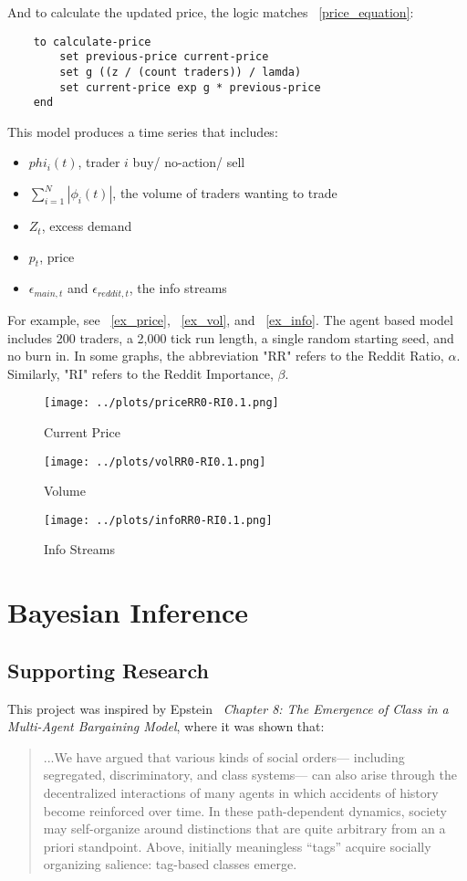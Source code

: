 \documentclass[a4paper, 11pt]{report}
\let\Oldsection\section
\renewcommand{\section}{\FloatBarrier\Oldsection}
\begin{document}
	\noindent And to calculate the updated price, the logic matches ~\autoref{price_equation}:
	\begin{lstlisting}
	to calculate-price
		set previous-price current-price
		set g ((z / (count traders)) / lamda)
		set current-price exp g * previous-price
	end
	\end{lstlisting}
	
	\noindent This model produces a time series that includes:
	\begin{itemize}
		\item $phi_{i}(t)$, trader $i$ buy/ no-action/ sell
		\item $\sum_{i=1}^{N} | \phi_{i}(t) |$, the volume of traders wanting to trade
		\item $Z_{t}$, excess demand
		\item $p_{t}$, price
		\item $\epsilon_{main,t}$ and $\epsilon_{reddit,t}$, the info streams
	\end{itemize}

	For example, see ~\autoref{ex_price}, ~\autoref{ex_vol}, and ~\autoref{ex_info}. The agent based model includes 200 traders, a 2,000 tick run length, a single random starting seed, and no burn in. In some graphs, the abbreviation "RR" refers to the Reddit Ratio, $\alpha$. Similarly, "RI" refers to the Reddit Importance, $\beta$. 
\begin{figure}[h!]
	\caption{Current Price}
	\label{ex_price}
	\texttt{[image: ../plots/priceRR0-RI0.1.png]}
\end{figure}

\begin{figure}[h!]
	\caption{Volume}
	\label{ex_vol}
	\texttt{[image: ../plots/volRR0-RI0.1.png]}
\end{figure}

\begin{figure}[h!]
	\caption{Info Streams}
	\label{ex_info}
	\texttt{[image: ../plots/infoRR0-RI0.1.png]}
\end{figure}

\chapter{Bayesian Inference}
\section{Supporting Research}
	This project was inspired by Epstein~\cite{epstein2007generative} \textit{Chapter 8: The Emergence of Class in a Multi-Agent Bargaining Model}, where it was shown that:
	\begin{quote}
		...We have argued that various kinds of social orders— including segregated, discriminatory, and class systems— can also arise through the decentralized interactions of many agents in which accidents of history become reinforced over time. In these path-dependent dynamics, society may self-organize around distinctions that are quite arbitrary from an a priori standpoint. Above, initially meaningless “tags” acquire socially organizing salience: tag-based classes emerge.
	\end{quote}
\end{document}
